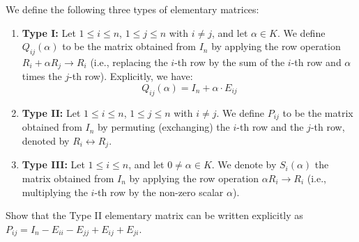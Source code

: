 \begin{definition*}
We define the following three types of elementary matrices:
\begin{enumerate}
    \item \textbf{Type I:} Let $1 \le i \le n$, $1 \le j \le n$ with $i \neq j$, and let $\alpha \in K$. We define $Q_{ij}(\alpha)$ to be the matrix obtained from $I_n$ by applying the row operation $R_i + \alpha R_j \longrightarrow R_i$ (i.e., replacing the $i$-th row by the sum of the $i$-th row and $\alpha$ times the $j$-th row). Explicitly, we have:
    \begin{equation*}
        Q_{ij}(\alpha) = I_n + \alpha \cdot E_{ij}
    \end{equation*}
    
    \item \textbf{Type II:} Let $1 \le i \le n$, $1 \le j \le n$ with $i \neq j$. We define $P_{ij}$ to be the matrix obtained from $I_n$ by permuting (exchanging) the $i$-th row and the $j$-th row, denoted by $R_i \leftrightarrow R_j$.
    
    \item \textbf{Type III:} Let $1 \le i \le n$, and let $0 \neq \alpha \in K$. We denote by $S_i(\alpha)$ the matrix obtained from $I_n$ by applying the row operation $\alpha R_i \longrightarrow R_i$ (i.e., multiplying the $i$-th row by the non-zero scalar $\alpha$).
\end{enumerate}
\end{definition*}

\begin{exercise}
\label{exc:permutation_matrix_form}
Show that the Type II elementary matrix can be written explicitly as $P_{ij} = I_n - E_{ii} - E_{jj} + E_{ij} + E_{ji}$.
\end{exercise}

